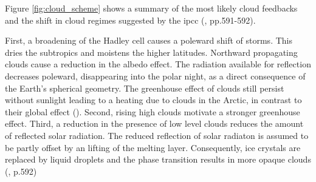Figure \ref{fig:cloud_scheme} shows a summary of the most likely cloud feedbacks and the shift in cloud regimes suggested by the \acrshort{ipcc} (\cite{IPCC_CH7_clouds}, pp.591-592).

First, a broadening of the Hadley cell causes a poleward shift of storms. This dries the subtropics and moistens the higher latitudes. Northward propagating clouds cause a reduction in the albedo effect. The radiation available for reflection decreases poleward, disappearing into the polar night, as a direct consequence of the Earth's spherical geometry.  
The greenhouse effect of clouds still persist without sunlight leading to a heating due to clouds in the Arctic, in contrast to their global effect (\cite{WangArticCRE}). 
Second, rising high clouds motivate a stronger greenhouse effect. Third, a reduction in the presence of low level clouds reduces the amount of reflected solar radiation. The reduced reflection of solar radiaton is assumed to be partly offset by an lifting of the melting layer. Consequently, ice crystals are replaced by liquid droplets and the phase transition results in more opaque clouds (\cite{IPCC_CH7_clouds}, p.592) 

